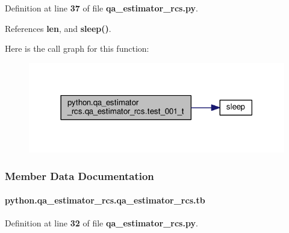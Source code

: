 Definition at line {\bf 37} of file {\bf qa\+\_\+estimator\+\_\+rcs.\+py}.



References {\bf len}, and {\bf sleep()}.



Here is the call graph for this function\+:
\nopagebreak
\begin{figure}[H]
\begin{center}
\leavevmode
\includegraphics[width=318pt]{d7/dd7/classpython_1_1qa__estimator__rcs_1_1qa__estimator__rcs_a2eaeee0a261ff1b408f6b36e190092ff_cgraph}
\end{center}
\end{figure}




\subsubsection{Member Data Documentation}
\paragraph[{tb}]{\setlength{\rightskip}{0pt plus 5cm}python.\+qa\+\_\+estimator\+\_\+rcs.\+qa\+\_\+estimator\+\_\+rcs.\+tb}\label{classpython_1_1qa__estimator__rcs_1_1qa__estimator__rcs_ad2673af86d0001c34e3c3ca7112c1d81}


Definition at line {\bf 32} of file {\bf qa\+\_\+estimator\+\_\+rcs.\+py}.



